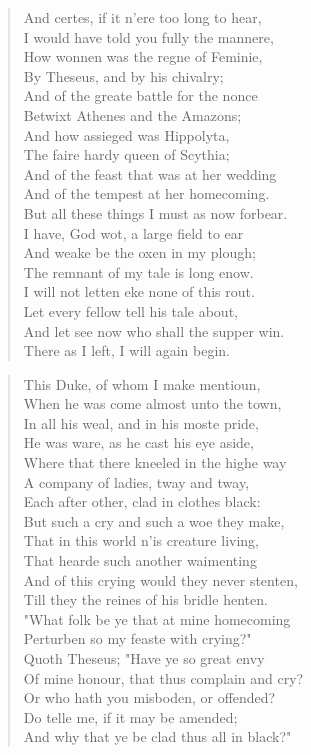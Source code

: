 \documentclass{article}
\begin{document}
\begin{verse}
And certes, if it n'ere too long to hear,\\
I would have told you fully the mannere,\\
How wonnen was the regne of Feminie,\\
By Theseus, and by his chivalry;\\
And of the greate battle for the nonce\\
Betwixt Athenes and the Amazons;\\
And how assieged was Hippolyta,\\
The faire hardy queen of Scythia;\\
And of the feast that was at her wedding\\
And of the tempest at her homecoming.\\
But all these things I must as now forbear.\\
I have, God wot, a large field to ear\\
And weake be the oxen in my plough;\\
The remnant of my tale is long enow.\\
I will not letten eke none of this rout.\\
Let every fellow tell his tale about,\\
And let see now who shall the supper win.\\
There as I left, I will again begin.
\end{verse}

\begin{verse}
This Duke, of whom I make mentioun,\\
When he was come almost unto the town,\\
In all his weal, and in his moste pride,\\
He was ware, as he cast his eye aside,\\
Where that there kneeled in the highe way\\
A company of ladies, tway and tway,\\
Each after other, clad in clothes black:\\
But such a cry and such a woe they make,\\
That in this world n'is creature living,\\
That hearde such another waimenting\\
And of this crying would they never stenten,\\
Till they the reines of his bridle henten.\\
"What folk be ye that at mine homecoming\\
Perturben so my feaste with crying?"\\
Quoth Theseus; "Have ye so great envy\\
Of mine honour, that thus complain and cry?\\
Or who hath you misboden, or offended?\\
Do telle me, if it may be amended;\\
And why that ye be clad thus all in black?"
\end{verse}
\end{document}
